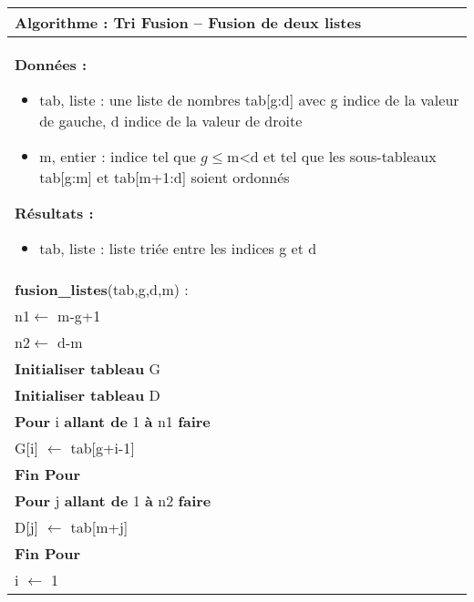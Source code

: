 \documentclass[10pt,fleqn]{article} %
\begin{document}
\begin{pseudo}
~\\
\begin{tabular}{p{}}
\hline
\textbf{Algorithme :} Tri Fusion -- Fusion de deux listes\\
\hline
\textbf{Données :}
\begin{itemize}
\item \textsf{tab}, liste : une liste de nombres \textsf{tab[g:d]} avec \textsf{g} indice de la valeur de gauche, \textsf{d} indice de la valeur de droite
\item \textsf{m}, entier : indice tel que \textsf{$g\leq$m<d} et tel que les sous-tableaux \textsf{tab[g:m]} et \textsf{tab[m+1:d]} soient ordonnés
\end{itemize}
\textbf{Résultats :} 
\begin{itemize}
\item \textsf{tab}, liste : liste triée entre les indices \textsf{g} et \textsf{d}
\end{itemize}
\\
\textbf{fusion\_listes}(\textsf{tab,g,d,m}) :\\
\hspace{.4cm} \textsf{n1$\leftarrow$ m-g+1}\\
\hspace{.4cm} \textsf{n2$\leftarrow$ d-m}\\
\hspace{.4cm} \textbf{Initialiser tableau} \textsf{G}  \\
\hspace{.4cm} \textbf{Initialiser tableau} \textsf{D}  \\
\hspace{.4cm} \textbf{Pour} \textsf{i} \textbf{allant de} \textsf{1} \textbf{à} \textsf{n1} \textbf{faire}\\
\hspace{.8cm}  \textsf{G[i] $ \leftarrow$ tab[g+i-1]}\\
\hspace{.4cm}  \textbf{Fin Pour}\\
\hspace{.4cm} \textbf{Pour} \textsf{j} \textbf{allant de} \textsf{1} \textbf{à} \textsf{n2} \textbf{faire}\\
\hspace{.8cm} \textsf{D[j] $ \leftarrow$ tab[m+j]}\\
\hspace{.4cm} \textbf{Fin Pour}\\
\hspace{.4cm} \textsf{i $\leftarrow$ 1}\\

\end{tabular}
\end{pseudo}
\end{document}
